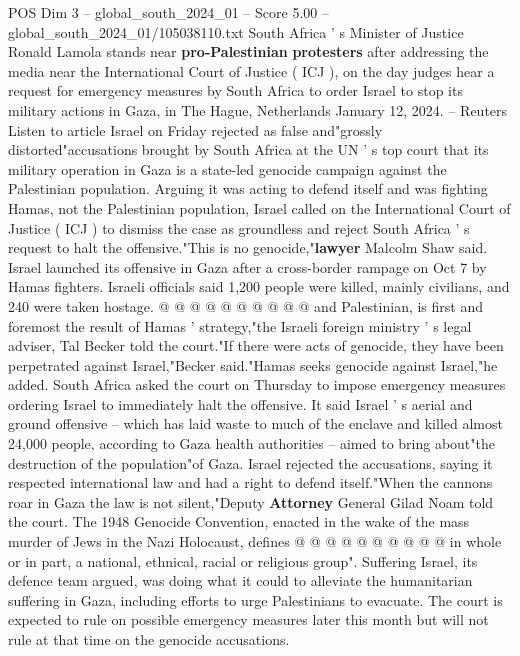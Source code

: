 \begin{textsample}{POS Dim 3 – global\_south\_2024\_01 – Score 5.00 – global\_south\_2024\_01/105038110.txt}  \label{ex:f3_pos_387}
South Africa ' s Minister of Justice Ronald Lamola stands near \textbf{pro-Palestinian} \textbf{protesters} after addressing the media near the International Court of Justice ( ICJ ), on the day judges hear a request for emergency measures by South Africa to order Israel to stop its military actions in Gaza, in The Hague, Netherlands January 12, 2024. -- Reuters Listen to article Israel on Friday rejected as false and"grossly distorted"accusations brought by South Africa at the UN ' s top court that its military operation in Gaza is a state-led genocide campaign against the Palestinian population.
Arguing it was acting to defend itself and was fighting Hamas, not the Palestinian population, Israel called on the International Court of Justice ( ICJ ) to dismiss the case as groundless and reject South Africa ' s request to halt the offensive."This is no genocide,"\textbf{lawyer} Malcolm Shaw said.
Israel launched its offensive in Gaza after a cross-border rampage on Oct 7 by Hamas fighters.
Israeli officials said 1,200 people were killed, mainly civilians, and 240 were taken hostage. @ @ @ @ @ @ @ @ @ @ and Palestinian, is first and foremost the result of Hamas ' strategy,"the Israeli foreign ministry ' s legal adviser, Tal Becker told the court."If there were acts of genocide, they have been perpetrated against Israel,"Becker said."Hamas seeks genocide against Israel,"he added.
South Africa asked the court on Thursday to impose emergency measures ordering Israel to immediately halt the offensive.
It said Israel ' s aerial and ground offensive -- which has laid waste to much of the enclave and killed almost 24,000 people, according to Gaza health authorities -- aimed to bring about"the destruction of the population"of Gaza.
Israel rejected the accusations, saying it respected international law and had a right to defend itself."When the cannons roar in Gaza the law is not silent,"Deputy \textbf{Attorney} General Gilad Noam told the court.
The 1948 Genocide Convention, enacted in the wake of the mass murder of Jews in the Nazi Holocaust, defines @ @ @ @ @ @ @ @ @ @ in whole or in part, a national, ethnical, racial or religious group".
Suffering Israel, its defence team argued, was doing what it could to alleviate the humanitarian suffering in Gaza, including efforts to urge Palestinians to evacuate.
The court is expected to rule on possible emergency measures later this month but will not rule at that time on the genocide accusations.

\end{textsample}
